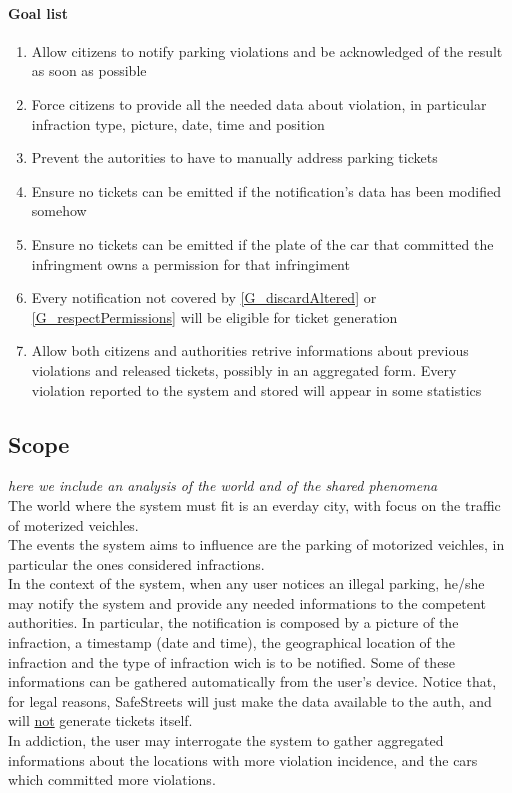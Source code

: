 \documentclass{article}
\newcommand{\enum}[1]{\texttt{#1.\arabic*}}
\begin{document}
		\paragraph{Goal list}
			\begin{enumerate}[label=\enum{G}]
				\item  \label{G_realTime}Allow citizens to notify parking violations and be acknowledged of the result as soon as possible
				\item \label{G_allData}Force citizens to provide all the needed data about violation, in particular infraction type, picture, date, time and position
				\item \label{G_helpAuth}Prevent the autorities to have to manually address parking tickets
				\item \label{G_discardAltered} Ensure no tickets can be emitted if the notification's data has been modified somehow
				\item \label{G_respectPermissions} Ensure no tickets can be emitted if the plate of the car that committed the infringment owns a permission for that infringiment
				\item \label{G_storeFine} Every notification not covered by \ref{G_discardAltered} or \ref{G_respectPermissions} will be eligible for ticket generation
				\item \label{G_statistics}Allow both citizens and authorities retrive informations about previous violations and released tickets, possibly in an aggregated form. Every violation reported to the system and stored will appear in some statistics
				
			\end{enumerate}

	\subsection{Scope} \textit{here we include an analysis of the world and of the shared phenomena}\\
	The world where the system must fit is an everday city, with focus on the traffic of moterized veichles.\\
	The events the system aims to influence are the parking of motorized veichles,  in particular the ones considered infractions.\\
	In the context of the system, when any user notices an illegal parking, he/she may notify the system and provide any needed informations to the competent authorities. In particular, the notification is composed by a picture of the infraction, a timestamp (date and time), the geographical location of the infraction and the type of infraction wich is to be notified. Some of these informations can be gathered automatically from the user's device. Notice that, for legal reasons, SafeStreets will just make the data available to the auth, and will \underline{not} generate tickets itself. \\
	In addiction, the user may interrogate the system to gather aggregated informations about the locations with more violation incidence, and the cars which committed more violations. 
	
\end{document}
